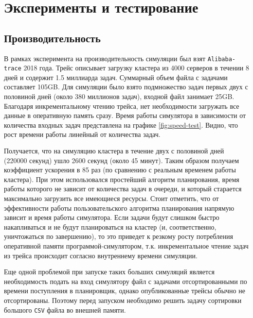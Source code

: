 \section{Эксперименты и тестирование}\label{sec:experiments}

\subsection{Производительность}\label{sec:experiments-speed}

В рамках эксперимента на производительность симуляции был взят \texttt{Alibaba-trace} 2018 года\cite{alibaba-clusterdata}. Трейс описывает загрузку кластера из 4000 серверов в течении 8 дней и содержит 1.5 миллиарда задач. Суммарный объем файла с задачами составляет 105GB. Для симуляции было взято подмножество задач первых двух с половиной дней (около 380 миллионов задач), входной файл занимает 25GB. Благодаря инкрементальному чтению трейса, нет необходимости загружать все данные в оперативную память сразу. Время работы симулятора в зависимости от количества входных задач представлена на графике \ref{fig:speed-test}. 
Видно, что рост времени работы линейный от количества задач.

Получается, что на симуляцию кластера в течение двух с половиной дней (220000 секунд) ушло 2600 секунд (около 45 минут). Таким образом получаем коэффициент ускорения в 85 раз (по сравнению с реальным временем работы кластера). При этом использовался простейший алгоритм планирования, время работы которого не зависит от количества задач в очереди, и который старается максимально загрузить все имеющиеся ресурсы. Стоит отметить, что от эффективности работы пользовательского алгоритма планирования напрямую зависит и время работы симулятора. Если задачи будут слишком быстро накапливаться и не будут планироваться на кластер (и, соответственно, уничтожаться по завершению), то это приведет к резкому росту потребления оперативной памяти программой-симулятором, т.к. инкрементальное чтение задач из трейса происходит согласно внутреннему времени симуляции.

Еще одной проблемой при запуске таких больших симуляций является необходимость подать на вход симулятору файл с задачами отсортированными по времени поступления в планировщик, однако опубликованные трейсы обычно не отсортированы. Поэтому перед запуском необходимо решить задачу сортировки большого \texttt{CSV} файла во внешней памяти. 

